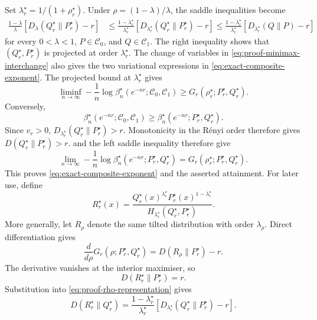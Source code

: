 \documentclass[journal,10pt,draftclsnofoot,onecolumn]{IEEEtran}
\begin{document}
\begin{IEEEproof}
Set $\lambda_r^\star =1/(1+\rho_r^\star).$ Under $\rho=(1-\lambda)/\lambda$, the saddle inequalities become
\begin{equation}
\begin{aligned} 
\frac{1-\lambda}{\lambda} \left[ D_\lambda(Q_r^\star\|P_r^\star)-r \right] &\leq \frac{1-\lambda_r^\star}{\lambda_r^\star} \left[ D_{\lambda_r^\star}(Q_r^\star\|P_r^\star)-r \right]  \leq \frac{1-\lambda_r^\star}{\lambda_r^\star} \left[ D_{\lambda_r^\star}(Q\|P)-r \right]
\end{aligned}
\label{eq:proof-exact-exponent-saddle}
\end{equation} 
for every $0<\lambda<1$, $P\in\mathcal C_0$, and $Q\in\mathcal C_1$. The right inequality shows that $(Q_r^\star,P_r^\star)$ is projected at order $\lambda_r^\star$. The change of variables in \eqref{eq:proof-minimax-interchange} also gives the two variational expressions in \eqref{eq:exact-composite-exponent}. The projected bound at $\lambda_r^\star$ gives
\begin{equation*} 
\liminf_{n\to\infty} -\frac{1}{n} \log \beta_n^\star(e^{-nr};\mathcal C_0,\mathcal C_1) \geq G_r(\rho_r^\star;P_r^\star,Q_r^\star).
\end{equation*}
Conversely,
\begin{equation*} 
\beta_n^\star(e^{-nr};\mathcal C_0,\mathcal C_1) \geq \beta_n^\star(e^{-nr};P_r^\star,Q_r^\star).
\end{equation*}
Since $v_r>0$, $D_{\lambda_r^\star}(Q_r^\star\|P_r^\star)>r.$ Monotonicity in the R\'enyi order therefore gives $D(Q_r^\star\|P_r^\star)>r.$  and the left saddle inequality therefore give
\begin{equation*} 
\lim_{n\to\infty} -\frac{1}{n} \log \beta_n^\star(e^{-nr};P_r^\star,Q_r^\star) = G_r(\rho_r^\star;P_r^\star,Q_r^\star).
\end{equation*}
This proves \eqref{eq:exact-composite-exponent} and the asserted
attainment. For later use, define
\begin{equation} 
R_r^\star(x) = \frac{ Q_r^\star(x)^{\lambda_r^\star} P_r^\star(x)^{1-\lambda_r^\star} }{ H_{\lambda_r^\star}(Q_r^\star,P_r^\star) }.
\label{eq:proof-exact-exponent-distribution}
\end{equation} 
More generally, let $R_\rho$ denote the same tilted distribution with order $\lambda_\rho$. Direct differentiation gives
\begin{equation*}
\frac{d}{d\rho} G_r(\rho;P_r^\star,Q_r^\star) = D(R_\rho\|P_r^\star)-r.
\end{equation*}
The derivative vanishes at the interior maximiser, so
\begin{equation} 
D(R_r^\star\|P_r^\star) = r.
\label{eq:proof-exact-exponent-rate-match}
\end{equation}
Substitution into \eqref{eq:proof-rho-representation} gives
\begin{equation} 
D(R_r^\star\|Q_r^\star) = \frac{1-\lambda_r^\star}{\lambda_r^\star} \left[ D_{\lambda_r^\star}(Q_r^\star\|P_r^\star)-r \right].
\label{eq:proof-exact-exponent-divergence}
\end{equation}
\end{IEEEproof}
\end{document}
